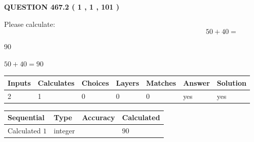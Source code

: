 \documentclass[12pt]{article}
\begin{document}
   
  
\vspace{0.2in}
  
{\textbf{\Large{QUESTION
467.2 
 ( 1 , 1 , 101 )
}}}
  
  
 
Please calculate:
\begin{equation}
50 +  %
40 = \nonumber
\end{equation}
 
 
 
\noindent{}
 
 

90
 
 
\noindent{}
 
 

 
 
 
\noindent{}
 
 

$ %
50 +  %
40=   %
90$
 
 
\noindent{}
 
 

 
   
   
   
   
\noindent\begin{tabular}{|l|l|l|l|l|l|l|}
 \hline
Inputs & Calculates & Choices & Layers & Matches & Answer & Solution \\ \hline
 2  & 
 1  & 
 0
  & 
 0  & 
 0  & 
  yes & 
  yes 
  \\ \hline
 \end{tabular}
   
   
   
   
\noindent{}
   
   
  
  
\noindent\begin{tabular}{|l|l|l|l|}
\hline
 Sequential & Type & Accuracy & Calculated \\ 
\hline
 
 
  Calculated $  1 $ & integer &  & 
  $ 90 $ 
 \\  \hline  
 \end{tabular}
   
\end{document}
